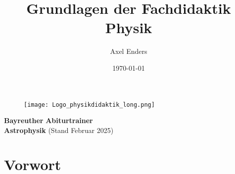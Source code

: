 \documentclass[11pt,a4paper]{book}
\title{Grundlagen der Fachdidaktik Physik}
\author{Axel Enders}
\date{\today}
\begin{document}
\begin{titlepage}
	\vs{0.5cm}
	\begin{figure}[h]
	\centering
	\texttt{[image: Logo\_physikdidaktik\_long.png]}
	\label{fig:Logo}
	\end{figure}
	
	\vs{1cm}
	\begin{center}
	\Large \textbf{Bayreuther}
	\bip\bip
	\Huge \textbf{Abiturtrainer \\ Astrophysik}
	\bip\bip
	\Large
	(Stand Februar 2025)
	\end{center}

	\vs{6cm}

%
%

\end{titlepage}

\newpage

\vs{3cm}
\section*{Vorwort}
\end{document}
